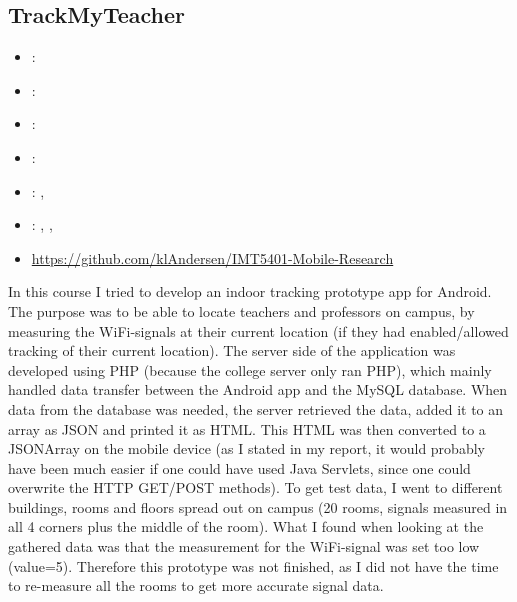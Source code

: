 \subsection{TrackMyTeacher}
\label{sec:trackmyteacher}
\begin{itemize} 
	\item {}: 
	\item {}: 
	\item {}: 
	\item {}: 
	\item {}: , 
	\item {}: , , 
	\item {} \url{https://github.com/klAndersen/IMT5401-Mobile-Research}
\end{itemize} 
In this course I tried to develop an indoor tracking prototype app for Android. 
The purpose was to be able to locate teachers and professors on campus, by measuring the WiFi-signals at their current location 
(if they had enabled/allowed tracking of their current location).
\vspace{0.5em}\newline
The server side of the application was developed using PHP (because the college server only ran PHP), which mainly handled data transfer between the Android app and the MySQL database.
When data from the database was needed, the server retrieved the data, added it to an array as JSON and printed it as HTML. 
This HTML was then converted to a JSONArray on the mobile device (as I stated in my report, it would probably have been much easier if one could have used Java Servlets, 
since one could overwrite the HTTP GET/POST methods).
\vspace{0.5em}\newline
To get test data, I went to different buildings, rooms and floors spread out on campus (20 rooms, signals measured in all 4 corners plus the middle of the room). 
What I found when looking at the gathered data was that the measurement for the WiFi-signal was set too low (value=5). 
Therefore this prototype was not finished, as I did not have the time to re-measure all the rooms to get more accurate signal data.

